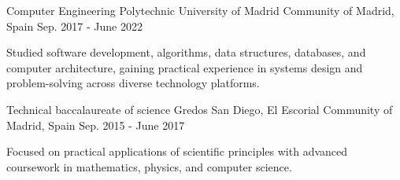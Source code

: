 

\begin{cventries}

  \cventry
    {Computer Engineering} %
    {Polytechnic University of Madrid} %
    {Community of Madrid, Spain} %
    {Sep. 2017 - June 2022} %
    {
      \begin{cvitems} %
        \item {Studied software development, algorithms, data structures, databases, and computer architecture, gaining practical experience in systems design and problem-solving across diverse technology platforms.}
      \end{cvitems}
    }

  \cventry
    {Technical baccalaureate of science} %
    {Gredos San Diego, El Escorial} %
    {Community of Madrid, Spain} %
    {Sep. 2015 - June 2017} %
    {
      \begin{cvitems} %
        \item {Focused on practical applications of scientific principles with advanced coursework in mathematics, physics, and computer science.}
      \end{cvitems}
    }

\end{cventries}
